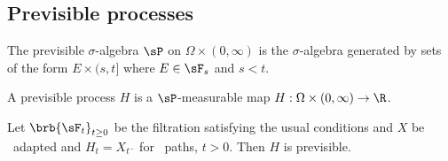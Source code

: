 
\subsection{Previsible processes}

\begin{definition}\label{def:previsible_sigma_algebra}
The previsible $\sigma$-algebra $\sP$ on $\Omega \times (0,\infty)$ is the $\sigma$-algebra generated by sets of the form $E \times(s, t]$ where $E \in \sF_s$ and $s < t$.
\end{definition}

\begin{definition}\label{def:previsible_process_continuous}
A previsible process $H$ is a $\sP$-measurable map $H: \Omega \times (0,\infty) \to \R$.
\end{definition}

\begin{proposition}\label{pro:previsible}
Let $\brb{\sF_t}_{t\geq 0}$ be the filtration satisfying the usual conditions and $X$ be \cadlag\ adapted and $H_t = X_{t^-}$ for \cadlag\ paths, $t > 0$. Then $H$ is previsible.
\end{proposition}

